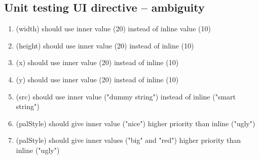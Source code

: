 \begin{singlespace}
\section{Unit testing UI directive -- ambiguity}
\begin{enumerate}
\item     (width) should use inner value (20) instead of inline value (10)
\item     (height) should use inner value (20) instead of inline (10)
\item     (x) should use inner value (20) instead of inline (10)
\item     (y) should use inner value (20) instead of inline (10)
\item     (src) should use inner value ("dummy string") instead of inline ("smart string")
\item     (palStyle) should give inner value ("nice") higher priority than inline ("ugly")
\item     (palStyle) should give inner values ("big" and "red") higher priority than inline ("ugly")
\end{enumerate}


\end{singlespace}
